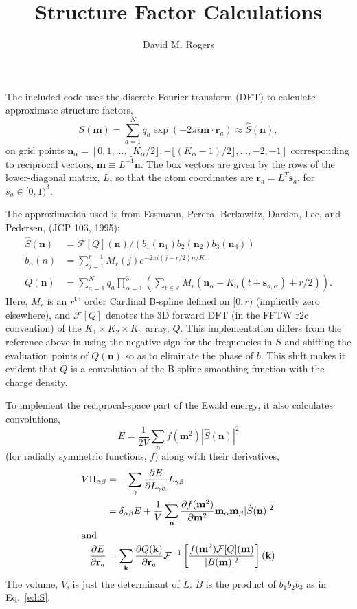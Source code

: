 \documentclass{amsart}
\title{ Structure Factor Calculations}
\author{ David M. Rogers}
\renewcommand{\vec}[1]{\mathbf{#1}}
\begin{document}
  The included code uses the discrete Fourier transform (DFT)
to calculate approximate structure factors,
\begin{equation}
S(\vec m) = \sum_{a=1}^N q_a \exp(-2\pi i \vec m\cdot \vec r_a)
  \approx \hat S(\vec n),
\end{equation}
on grid points $\vec n_\alpha = [0, 1, \ldots, \lfloor K_\alpha/2 \rfloor, -\lfloor (K_\alpha-1)/2 \rfloor, \ldots, -2, -1]$
corresponding to reciprocal vectors, $\vec m \equiv L^{-1} \vec n$.
The box vectors are given by the rows of the lower-diagonal matrix,
$L$, so that the atom coordinates are $\vec r_a = L^T \vec s_a$,
for $s_a \in [0,1)^3$.

  The approximation used is from Essmann, Perera, Berkowitz,
Darden, Lee, and Pedersen, (JCP 103, 1995):
\begin{align}
    \hat S(\vec n) &= \mathcal F[Q](\vec n)
                    / (b_1(\vec n_1) b_2(\vec n_2) b_3(\vec n_3)) \label{e:hS} \\
b_\alpha(n) &= \sum_{j=1}^{r-1} M_r(j) e^{-2\pi i (j-r/2) n/K_\alpha} \\
Q(\vec n) &= \sum_{a=1}^N q_a \prod_{\alpha=1}^3 \left(
    \sum_{t\in\mathbb Z} M_r(\vec n_\alpha - K_\alpha (t+\vec s_{a,\alpha}) + r/2) \right)
.
\end{align}
Here, $M_r$ is an $r^\text{th}$ order Cardinal B-spline defined on $[0,r)$
(implicitly zero elsewhere),
and $\mathcal F[Q]$ denotes the 3D forward DFT (in the FFTW r2c convention)
of the $K_1 \times K_2 \times K_3$ array, $Q$.
This implementation differs from the reference above in using the negative
sign for the frequencies in $S$ and shifting the evaluation points
of $Q(\vec n)$ so as to eliminate the phase of $b$.  This
shift makes it evident that $Q$ is a convolution of the B-spline
smoothing function with the charge density.

  To implement the reciprocal-space part of the Ewald energy, it also
calculates convolutions,
\begin{equation}
E = \frac{1}{2 V} \sum_{\vec n} f(\vec m^2) |\hat S(\vec n)|^2
\end{equation}
(for radially symmetric functions, $f$)
along with their derivatives,
\begin{align}
V \Pi_{\alpha\beta} &= -\sum_\gamma \frac{\partial E}{\partial L_{\gamma\alpha}}
            L_{\gamma\beta} \\
  &= \delta_{\alpha\beta} E
        + \frac{1}{V} \sum_{\vec n}
                            \frac{\partial f(\vec m^2)}{\partial \vec m^2}
            \vec m_\alpha \vec m_\beta |\hat S(\vec n)|^2 \\
\intertext{and}
\frac{\partial E}{\partial \vec r_a} &= \sum_{\vec k}
  \frac{\partial Q(\vec k)}{\partial \vec r_a}
                    \mathcal F^{-1}\left[
                        \frac{f(\vec m^2) \mathcal F[Q](\vec m)}{|B(\vec m)|^2}
                    \right](\vec k)
\end{align}
The volume, $V$, is just the determinant of $L$.
$B$ is the product of $b_1 b_2 b_3$ as in Eq.~\ref{e:hS}.
\end{document}
